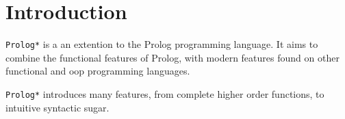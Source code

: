 \section{Introduction}

\texttt{Prolog*} is a an extention to the Prolog programming language. It aims to
combine the functional features of Prolog, with modern features found on
other functional and oop programming languages.

\texttt{Prolog*} introduces many features, from complete higher order functions, to
intuitive syntactic sugar.








